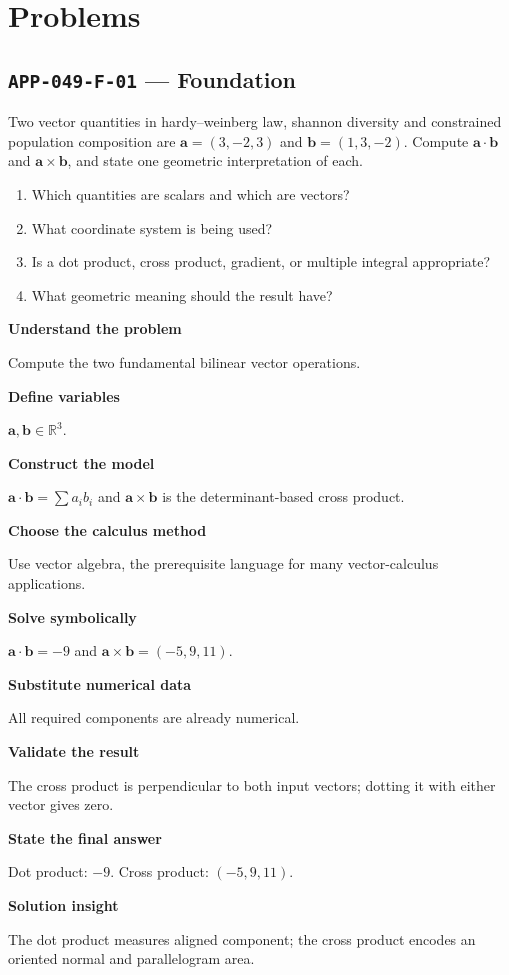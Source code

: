 \documentclass[11pt]{book}
\newcommand{\pid}[1]{\texttt{#1}}
\begin{document}
\section*{Problems}
\subsection*{\pid{APP-049-F-01} — Foundation}
\begin{problembox}
Two vector quantities in hardy–weinberg law, shannon diversity and constrained population composition are $\mathbf a=(3,-2,3)$ and $\mathbf b=(1,3,-2)$. Compute $\mathbf a\cdot\mathbf b$ and $\mathbf a\times\mathbf b$, and state one geometric interpretation of each.
\end{problembox}
\begin{promptbox}\begin{enumerate}
\item Which quantities are scalars and which are vectors?
\item What coordinate system is being used?
\item Is a dot product, cross product, gradient, or multiple integral appropriate?
\item What geometric meaning should the result have?
\end{enumerate}\end{promptbox}
\begin{solutionbox}
\textbf{Understand the problem}\par Compute the two fundamental bilinear vector operations.\par\medskip
\textbf{Define variables}\par $\mathbf a,\mathbf b\in\mathbb R^3$.\par\medskip
\textbf{Construct the model}\par $\mathbf a\cdot\mathbf b=\sum a_ib_i$ and $\mathbf a\times\mathbf b$ is the determinant-based cross product.\par\medskip
\textbf{Choose the calculus method}\par Use vector algebra, the prerequisite language for many vector-calculus applications.\par\medskip
\textbf{Solve symbolically}\par $\mathbf a\cdot\mathbf b=-9$ and $\mathbf a\times\mathbf b=(-5,9,11)$.\par\medskip
\textbf{Substitute numerical data}\par All required components are already numerical.\par\medskip
\textbf{Validate the result}\par The cross product is perpendicular to both input vectors; dotting it with either vector gives zero.\par\medskip
\textbf{State the final answer}\par Dot product: $-9$. Cross product: $(-5,9,11)$.\par\medskip
\textbf{Solution insight}\par The dot product measures aligned component; the cross product encodes an oriented normal and parallelogram area.\par\medskip
\end{solutionbox}
\end{document}
